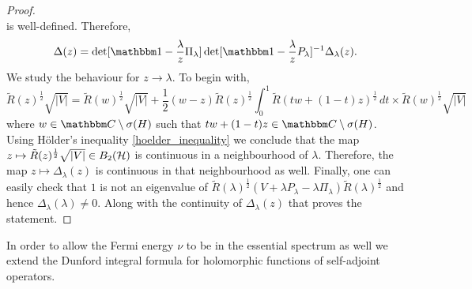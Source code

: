 \begin{proof}
\begin{equation*}
\end{equation*}
is well-defined. Therefore,
\begin{equation*}
  \Delta(z) = \det[\id-\frac{\lambda}{z}\Pi_\lambda ] \det[\id-\frac{\lambda}{z}P_\lambda]^{-1} \Delta_\lambda(z)  .
\end{equation*}
We study the behaviour for $z\to\lambda$. To begin with,
\begin{equation*}
  \tilde R(z)^{\frac{1}{2}}\sqrt{|V|}
     =   \tilde R(w)^{\frac{1}{2}}\sqrt{|V|}
           + \frac{1}{2} (w-z) \tilde R(z)^{\frac{1}{2}} \int_0^1 \tilde R(tw+(1-t)z)^{\frac{1}{2}}\, dt
                          \times \tilde R(w)^{\frac{1}{2}}\sqrt{|V|}
\end{equation*}
where $w\in\C\setminus\sigma(H)$ such that $tw+(1-t)z\in\C\setminus\sigma(H)$.
Using H\"older's inequality \ref{hoelder_inequality} we conclude that the map 
$z\mapsto\tilde R(z)^{\frac{1}{2}}\sqrt{|V|}\in B_2({\mathcal H})$ is continuous in a neighbourhood of $\lambda$. 
Therefore, the map $z\mapsto\Delta_\lambda(z)$ is continuous in that neighbourhood as well.
Finally, one can easily check that $1$ is not an eigenvalue of 
$\tilde R(\lambda)^{\frac{1}{2}}(V+\lambda P_\lambda - \lambda\Pi_\lambda)\tilde R(\lambda)^{\frac{1}{2}}$ and 
hence $\Delta_\lambda(\lambda)\neq 0$. Along with the continuity of $\Delta_\lambda(z)$ that
proves the statement.
\end{proof}

In order to allow the Fermi energy $\nu$ to be in the essential spectrum as well we extend 
the Dunford integral formula for holomorphic functions of self-adjoint operators.

